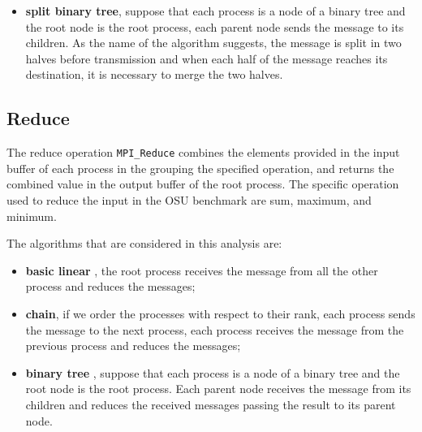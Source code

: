 \begin{itemize}
    \item \textbf{split binary tree}, suppose that each process is a node of a binary tree and the root node is the root process, each parent node sends the message to its children. As the name of the algorithm suggests, the message is split in two halves before transmission and when each half of the message reaches its destination, it is necessary to merge the two halves.
    \begin{center}
    \end{center}

\end{itemize}


\subsection{Reduce}

The reduce operation \texttt{MPI\_Reduce} combines the elements provided in the input buffer of each process in the grouping the specified operation, and returns the combined value in the output buffer of the root process. The specific operation used to reduce the input in the OSU benchmark are sum, maximum, and minimum.

The algorithms that are considered in this analysis are:
\begin{itemize}
    \item \textbf{basic linear }, the root process receives the message from all the other process and reduces the messages;
    \item \textbf{chain}, if we order the processes with respect to their rank, each process sends the message to the next process, each process receives the message from the previous process and reduces the messages;
    \item \textbf{binary tree }, suppose that each process is a node of a binary tree and the root node is the root process. Each parent node receives the message from its children and reduces the received messages passing the result to its parent node.
\end{itemize}